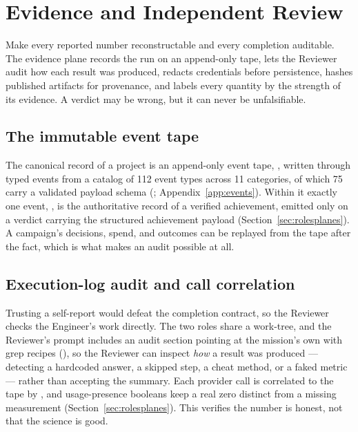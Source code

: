 \section{Evidence and Independent Review}
\label{sec:evidence}

\begin{designbox}
Make every reported number reconstructable and every completion auditable. The
evidence plane records the run on an append-only tape, lets the Reviewer audit how
each result was produced, redacts credentials before persistence, hashes published
artifacts for provenance, and labels every quantity by the strength of its evidence.
A verdict may be wrong, but it can never be unfalsifiable.
\end{designbox}

\subsection{The immutable event tape}

The canonical record of a project is an append-only event tape,
, written through typed events from a catalog of 112 event types
across 11 categories, of which 75 carry a validated payload schema
(; Appendix~\ref{app:events}). Within it exactly one
event, , is the authoritative record of a
verified achievement, emitted only on a  verdict carrying the structured
achievement payload (Section~\ref{sec:rolesplanes}). A campaign's decisions, spend,
and outcomes can be replayed from the tape after the fact, which is what makes an
audit possible at all.

\subsection{Execution-log audit and call correlation}

Trusting a self-report would defeat the completion contract, so the Reviewer checks
the Engineer's work directly. The two roles share a work-tree, and the Reviewer's
prompt includes an audit section pointing at the mission's own 
with grep recipes (), so the Reviewer can inspect
\emph{how} a result was produced --- detecting a hardcoded answer, a skipped step, a
cheat method, or a faked metric --- rather than accepting the summary. Each provider
call is correlated to the tape by , and usage-presence booleans keep a
real zero distinct from a missing measurement (Section~\ref{sec:rolesplanes}). This
verifies the number is honest, not that the science is good.

